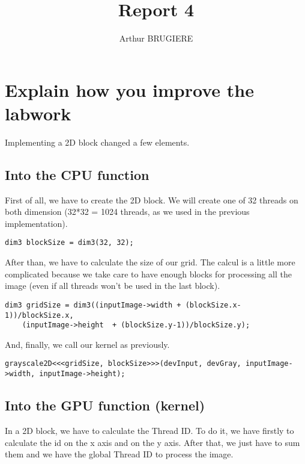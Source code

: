 \documentclass[11pt]{article} %
\title{Report 4}
\author{Arthur BRUGIERE}
\begin{document}
\maketitle

\section{Explain how you improve the labwork}

Implementing a 2D block changed a few elements.

\subsection{Into the CPU function}

First of all, we have to create the 2D block. We will create one of 32 threads on both dimension (32*32 = 1024 threads, as we used in the previous implementation).

\lstset{language=C}
\begin{lstlisting}
dim3 blockSize = dim3(32, 32);
\end{lstlisting}

After than, we have to calculate the size of our grid. The calcul is a little more complicated because we take care to have enough blocks for processing all the image (even if all threads won't be used in the last block). 

\lstset{language=C}
\begin{lstlisting}
dim3 gridSize = dim3((inputImage->width + (blockSize.x-1))/blockSize.x, 
    (inputImage->height  + (blockSize.y-1))/blockSize.y);
\end{lstlisting}

And, finally, we call our kernel as previously.

\lstset{language=C}
\begin{lstlisting}
grayscale2D<<<gridSize, blockSize>>>(devInput, devGray, inputImage->width, inputImage->height);
\end{lstlisting}

\subsection{Into the GPU function (kernel)}

In a 2D block, we have to calculate the Thread ID. To do it, we have firstly to calculate the id on the x axis and on the y axis. After that, we just have to sum them and we have the global Thread ID to process the image. 
\end{document}
